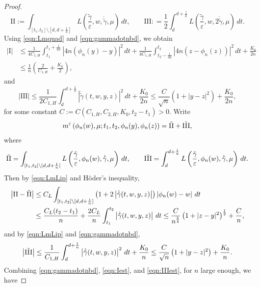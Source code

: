 \documentclass[reqno,11pt]{amsart}
\numberwithin{equation}{section}
\newcommand{\e}{\varepsilon}
\newcommand{\ep}{\varepsilon}
\begin{document}
\begin{proof}
\[
\mathrm{II}:=\int_{[t_1, t_2]\setminus[d, d+\frac{1}{n}]}
L \left(\frac{\tilde{\gamma}}{\e},w, \dot{\tilde{\gamma}},\mu\right)\,dt, \qquad
\mathrm{III}: =\frac{1}{2}\int_{d}^{d+\frac{1}{n}}
L \left(\frac{\tilde{\gamma}}{\e},w,2\dot{\tilde{\gamma}},\mu\right)\,dt.
\]
Using \eqref{eqn:Lmquad} and \eqref{eqn:gammadotnbd}, we obtain
\begin{equation}
\begin{aligned}\label{eqn:Iest}
|\mathrm{I}| & \leq \frac{1}{4C_{1, H}}\int_{t_1}^{t_1+\frac{1}{4n}}\left|4n(\phi_n(y)-y)\right|^2\,dt+ \frac{1}{4C_{1, H}}\int_{t_2-\frac{1}{4n}}^{t_2}\left|4n\left(z-\phi_n(z)\right)\right|^2\,dt +\frac{K_0}{2n}\\
&\leq \frac{1}{n}\left(\frac{2}{C_{1,H}}+\frac{K_0}{2}\right),
\end{aligned}
\end{equation}
and
\begin{equation}\label{eqn:IIIest}
|\mathrm{III}|\leq \frac{1}{2C_{1,H}} \int_{d}^{d+\frac{1}{n}}\left|\dot{\tilde{\gamma}}(t,w,y,z)\right|^2\,dt+\frac{K_0}{2n} \leq \frac{C}{\sqrt{n}} \left(1+|y-z|^2\right) + \frac{K_0}{2n},
\end{equation}
for some constant $C:=C(C_{1,H}, C_{2, H}, K_0,t_2-t_1)>0$. Write
\[
m^\ep\left(\phi_n(w), \mu;t_1, t_2, \phi_n(y), \phi_n(z)\right)= \tilde{{\rm II}}+\tilde{{\rm III}},
\]
where
\[\tilde{{\rm II}}=\int_{[t_1, t_2]\setminus[d, d+\frac{1}{n}]} L \left(\frac{\tilde{\gamma}}{\varepsilon},\phi_n(w),\dot{\tilde{\gamma}},\mu\right)\,dt, \qquad \tilde{{\rm III}}=\int_d^{d+\frac{1}{n}}L \left(\frac{\tilde{\gamma}}{\varepsilon},\phi_n(w),\dot{\tilde{\gamma}},\mu\right)\,dt.
\]
Then by \eqref{eqn:LmLip} and H\"oder's inequality,
\[
\begin{aligned}
\left|{\rm II}-{\rm \tilde{II}}\right|  &\leq  C_{L} \int_{[t_1, t_2]\setminus[d, d+\frac{1}{n}]}\left(1+2\left|\dot{\tilde{\gamma}}(t,w,y,z)\right|\right)\left|\phi_n(w)-w\right| \, dt \\
&\leq \frac{C_L(t_2-t_1)}{n}+\frac{2C_L}{n} \int_{t_1}^{t_2} \left|\dot{\tilde{\gamma}}(t,w,y,z)\right|\,dt \leq\frac{C}{n^\frac{5}{4}}\left(1+|z-y|^2\right)^\frac{1}{2}+\frac{C}{n},
\end{aligned}
\]
and by \eqref{eqn:LmLip} and \eqref{eqn:gammadotnbd},
\[
\left|\tilde{{\rm III}}\right| \leq \frac{1}{C_{1,H}}\int_{d}^{d+\frac{1}{n}}\left|\dot{\tilde{\gamma}}(t,w,y,z)\right|^2\,dt+\frac{K_0}{n} \leq \frac{C}{\sqrt{n}} \left(1+|y-z|^2\right)+\frac{K_0}{n}.
\]
Combining
\eqref{eqn:gammadotnbd}, \eqref{eqn:Iest}, and \eqref{eqn:IIIest}, for $n$ large enough, we have

\end{proof}
\end{document}

